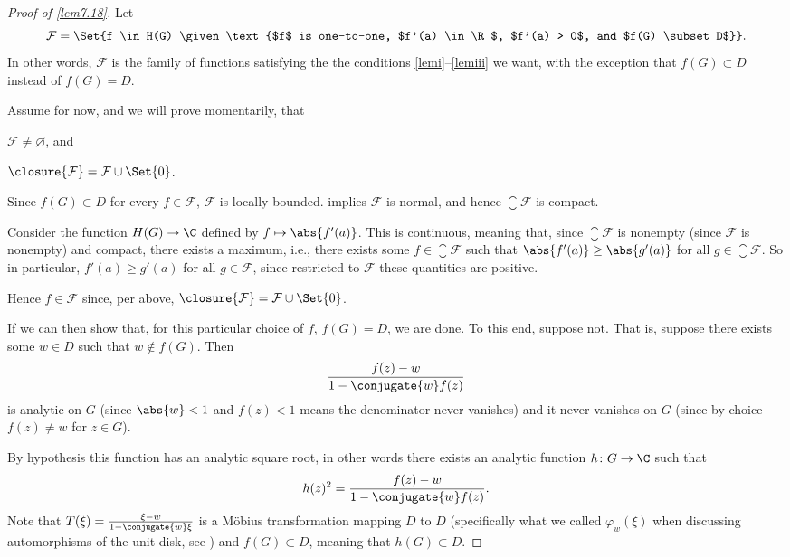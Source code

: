 \begin{proof}[Proof of \autoref{lem7.18}]
	Let
	\[
		\mathcal{F} = \Set{f \in H(G) \given \text{$f$ is one-to-one, $f'(a) \in \R$, $f'(a) > 0$, and $f(G) \subset D$}}.
	\]
	In other words, $\mathcal{F}$ is the family of functions satisfying the the conditions \ref{lemi}--\ref{lemiii} we want, with the exception that $f(G) \subset D$ instead of $f(G) = D$.

	Assume for now, and we will prove momentarily, that
	\begin{parts}
		\item\label{l18:pfa} $\mathcal{F} \neq \varnothing$, and
		\item\label{l18:pfb} $\closure{\mathcal{F}} = \mathcal{F} \cup \Set{0}$.
	\end{parts}

	Since $f(G) \subset D$ for every $f \in \mathcal{F}$, $\mathcal{F}$ is locally bounded.
	 implies $\mathcal{F}$ is normal, and hence $\closure{\mathcal{F}}$ is compact.

	Consider the function $H(G) \to \C$ defined by $f \mapsto \abs{f'(a)}$.
	This is continuous, meaning that, since $\closure{\mathcal{F}}$ is nonempty (since $\mathcal{F}$ is nonempty) and compact, there exists a maximum, i.e., there exists some $f \in \closure{\mathcal{F}}$ such that $\abs{f'(a)} \geq \abs{g'(a)}$ for all $g \in \closure{\mathcal{F}}$.
	So in particular, $f'(a) \geq g'(a)$ for all $g \in \mathcal{F}$, since restricted to $\mathcal{F}$ these quantities are positive.

	Hence $f \in \mathcal{F}$ since, per above, $\closure{\mathcal{F}} = \mathcal{F} \cup \Set{0}$.

	If we can then show that, for this particular choice of $f$, $f(G) = D$, we are done.
	To this end, suppose not.
	That is, suppose there exists some $w \in D$ such that $w \not\in f(G)$.
	Then
	\[
		\frac{f(z) - w}{1 - \conjugate{w} f(z)}
	\]
	is analytic on $G$ (since $\abs{w} < 1$ and $f(z) < 1$ means the denominator never vanishes) and it never vanishes on $G$ (since by choice $f(z) \neq w$ for $z \in G$).

	By hypothesis this function has an analytic square root, in other words there exists an analytic function $h \colon G \to \C$ such that
	\begin{equation}\label{l18:lemeqsquareroot}
		h(z)^2 = \frac{f(z) - w}{1 - \conjugate{w} f(z)}.
	\end{equation}
	Note that $T(\xi) = \frac{\xi - w}{1 - \conjugate{w} \xi}$ is a Möbius transformation mapping $D$ to $D$ (specifically what we called $\varphi_w(\xi)$ when discussing automorphisms of the unit disk, see ) and $f(G) \subset D$, meaning that $h(G) \subset D$.


\end{proof}
